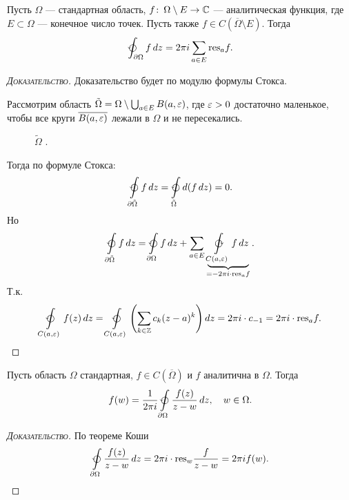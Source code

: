 \documentclass[../complex-analysis.tex]{subfiles}
\begin{document}
\begin{thm}
\label{theorem:cauchy_residue}
Пусть $ \Omega $ --- стандартная область, $ f\colon\,\Omega \setminus E \to \mathbb{C} $ --- аналитическая функция, где $ E \subset \Omega $  --- конечное число точек. Пусть также $ f \in C(\overline{\Omega} \setminus E) $. Тогда
\begin{align*}
 \varointctrclockwise_{\partial \Omega} f\,dz = 2\pi i \sum_{a \in E} \res_{a} f.
\end{align*}
\end{thm}
\begin{proof}[\normalfont\textsc{Доказательство}]
 Доказательство будет по модулю формулы Стокса. 

 Рассмотрим область $ \tilde \Omega = \Omega \setminus \bigcup_{a \in E} B(a,\varepsilon) $, где $ \varepsilon > 0 $ достаточно маленькое, чтобы все круги $ \overline {B(a,\varepsilon)} $ лежали в $ \Omega $ и не пересекались.

\begin{figure}[ht]
    \centering
    \caption{$\tilde \Omega$ .}
    \label{fig:theorem_cauchy_omega_tilde}
\end{figure}

 Тогда по формуле Стокса:
 \begin{align*}
  \varointctrclockwise \limits_{\partial \tilde \Omega}   f\,dz = \varointctrclockwise\limits_{\tilde \Omega} d(f\,dz) = 0.
 \end{align*} Но
 \begin{align*}
  \varointctrclockwise\limits_{\partial \tilde \Omega} f\,dz = \varointctrclockwise\limits_{\partial \Omega} f\,dz + \sum_{a \in E} \underbrace{\varointclockwise\limits_{C(a,\eps)}f\,dz}_{=-2\pi i \cdot \res_a f}.
 \end{align*} Т.к.
 \begin{align*}
  \varointctrclockwise\limits_{C(a,\eps)}f(z)\,dz = \varointctrclockwise\limits_{C(a,\eps)} \left( \sum_{k \in \Z} c_k(z-a)^{k} \right)dz = 2\pi i \cdot c_{-1} = 2\pi i \cdot \res_a f.
 \end{align*}
\end{proof}

\begin{crly}
 Пусть область $ \Omega $ стандартная, $ f \in C(\overline \Omega) $ и $ f $ аналитична в $ \Omega $. Тогда
 \begin{align*}
  f(w) = \frac{1}{2\pi i} \varointctrclockwise\limits_{\partial\Omega} \frac{f(z)}{z-w}\,dz,\quad w \in \Omega.
 \end{align*}
\end{crly}
\begin{proof}[\normalfont\textsc{Доказательство}]
 По теореме Коши
 \begin{align*}
  \varointctrclockwise\limits_{\partial \Omega} \frac{f(z)}{z-w}\,dz = 2\pi i \cdot \res_w \frac{f}{z-w} = 2\pi i f(w).
 \end{align*}
\end{proof}
\end{document}
